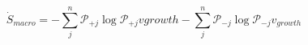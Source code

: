 \begin{equation}
\dot S_{macro} = -\sum_j^n\mathcal P_{+j}\log\mathcal P_{+j}v{growth} -\sum_j^n\mathcal P_{-j}\log\mathcal P_{-j} v_{growth}
\end{equation}